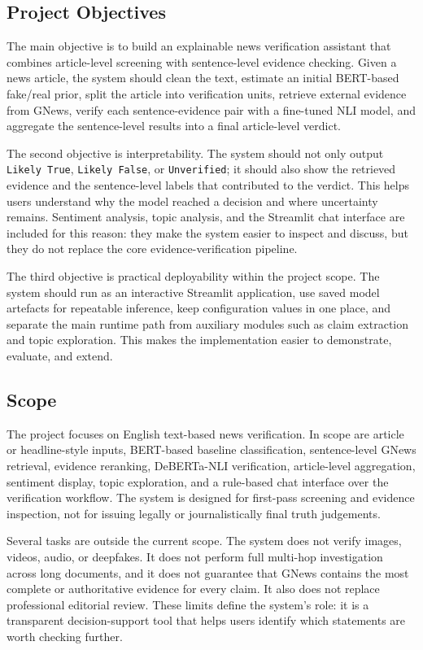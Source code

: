 \documentclass[11pt]{article}
\newcommand{\code}[1]{\texttt{#1}}
\begin{document}
\subsection{Project Objectives}

The main objective is to build an explainable news verification assistant that
combines article-level screening with sentence-level evidence checking. Given a
news article, the system should clean the text, estimate an initial BERT-based
fake/real prior, split the article into verification units, retrieve external
evidence from GNews, verify each sentence-evidence pair with a fine-tuned NLI
model, and aggregate the sentence-level results into a final article-level
verdict.

The second objective is interpretability. The system should not only output
\code{Likely True}, \code{Likely False}, or \code{Unverified}; it should also
show the retrieved evidence and the sentence-level labels that contributed to
the verdict. This helps users understand why the model reached a decision and
where uncertainty remains. Sentiment analysis, topic analysis, and the
Streamlit chat interface are included for this reason: they make the system
easier to inspect and discuss, but they do not replace the core
evidence-verification pipeline.

The third objective is practical deployability within the project scope. The
system should run as an interactive Streamlit application, use saved model
artefacts for repeatable inference, keep configuration values in one place, and
separate the main runtime path from auxiliary modules such as claim extraction
and topic exploration. This makes the implementation easier to demonstrate,
evaluate, and extend.

\subsection{Scope}

The project focuses on English text-based news verification. In scope are
article or headline-style inputs, BERT-based baseline classification,
sentence-level GNews retrieval, evidence reranking, DeBERTa-NLI verification,
article-level aggregation, sentiment display, topic exploration, and a
rule-based chat interface over the verification workflow. The system is designed
for first-pass screening and evidence inspection, not for issuing legally or
journalistically final truth judgements.

Several tasks are outside the current scope. The system does not verify images,
videos, audio, or deepfakes. It does not perform full multi-hop investigation
across long documents, and it does not guarantee that GNews contains the most
complete or authoritative evidence for every claim. It also does not replace
professional editorial review. These limits define the system's role: it is a
transparent decision-support tool that helps users identify which statements are
worth checking further.
\end{document}
